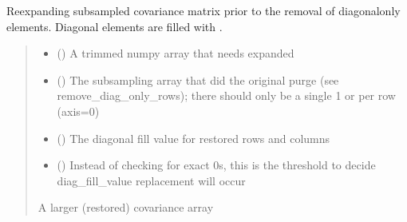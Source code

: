 \documentclass[letterpaper,10pt,english]{sphinxmanual}
\begin{document}

\begin{fulllineitems}
\label{\detokenize{kalman:glomar_gridding.autoregressive_kalman.cov_diagonal.restore_diag_only_rows}}
\pysigstartsignatures
\pysiglinewithargsret
{}
{\sphinxparamcomma {}\sphinxparamcomma {}}
{}
\pysigstopsignatures
\sphinxAtStartPar
Re\sphinxhyphen{}expanding subsampled covariance matrix prior to
the removal of diagonal\sphinxhyphen{}only elements. Diagonal elements are
filled with .
\begin{quote}\begin{description}
\begin{itemize}
\item {}
\sphinxAtStartPar
{} () \textendash{} A trimmed numpy array that needs expanded

\item {}
\sphinxAtStartPar
{} () \textendash{} The subsampling array that did the original purge
(see remove\_diag\_only\_rows); there should only be a
single 1 or  per row (axis=0)

\item {}
\sphinxAtStartPar
{} () \textendash{} The diagonal fill value for restored rows and columns

\item {}
\sphinxAtStartPar
{} () \textendash{} Instead of checking for exact 0s, this is the threshold
to decide diag\_fill\_value replacement will occur

\end{itemize}

\sphinxAtStartPar
{} \textendash{} A larger (restored) covariance array

\sphinxAtStartPar
{}

\end{description}\end{quote}

\end{fulllineitems}
\end{document}
